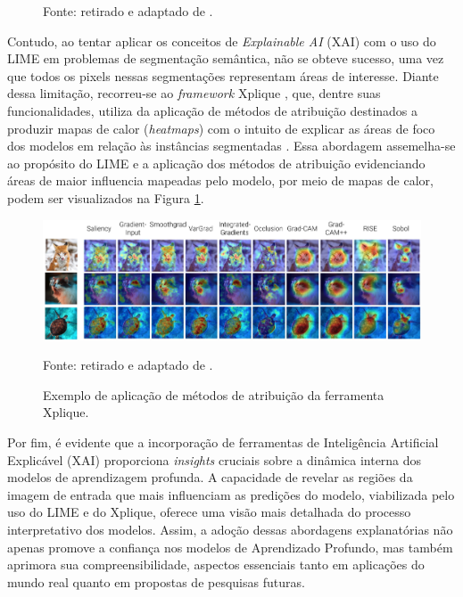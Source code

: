 \begin{figure}[H]
    Fonte: retirado e adaptado de \cite{Ribeiro2016WhyClassifier}.
\end{figure}

Contudo, ao tentar aplicar os conceitos de \textit{Explainable AI} (XAI) com o uso do LIME em problemas de segmentação semântica, não se obteve sucesso, uma vez que todos os pixels nessas segmentações representam áreas de interesse. Diante dessa limitação, recorreu-se ao \textit{framework} Xplique \citep{Fel2022}, que, dentre suas funcionalidades, utiliza da aplicação de métodos de atribuição destinados a produzir mapas de calor (\textit{heatmaps}) com o intuito de explicar as áreas de foco dos modelos em relação às instâncias segmentadas \citep{Fel2022}. Essa abordagem assemelha-se ao propósito do LIME e a aplicação dos métodos de atribuição evidenciando áreas de maior influencia mapeadas pelo modelo, por meio de mapas de calor, podem ser visualizados na Figura \ref{project:fig:explain:xplique}.

\begin{figure}[H]
    \centering
    \caption{Exemplo de aplicação de métodos de atribuição da ferramenta Xplique.}
    \includegraphics[width=1\textwidth]{recursos/imagens/project/xplique.png}
    \label{project:fig:explain:xplique}

    Fonte: retirado e adaptado de \cite{Fel2022}.
\end{figure}

Por fim, é evidente que a incorporação de ferramentas de Inteligência Artificial Explicável (XAI) proporciona \textit{insights} cruciais sobre a dinâmica interna dos modelos de aprendizagem profunda. A capacidade de revelar as regiões da imagem de entrada que mais influenciam as predições do modelo, viabilizada pelo uso do LIME e do Xplique, oferece uma visão mais detalhada do processo interpretativo dos modelos. Assim, a adoção dessas abordagens explanatórias não apenas promove a confiança nos modelos de Aprendizado Profundo, mas também aprimora sua compreensibilidade, aspectos essenciais tanto em aplicações do mundo real quanto em propostas de pesquisas futuras.

